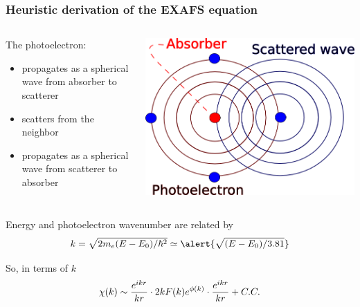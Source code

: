 \documentclass[10pt, xcolor=x11names, compress]{beamer}
\begin{document}
\begin{frame}
  \frametitle{Heuristic derivation of the EXAFS equation}
  \begin{columns}
    \begin{column}{0.5\linewidth}
      The photoelectron:
      \begin{itemize}
      \item propagates as a spherical wave from absorber to scatterer
      \item scatters from the neighbor
      \item propagates as a spherical wave from scatterer to absorber
      \end{itemize}
    \end{column}
    \begin{column}{0.5\linewidth}
      \includegraphics[width=\linewidth]{images/circles.png}
    \end{column}
  \end{columns}
  
  \bigskip

  Energy and photoelectron wavenumber are related by
  \begin{equation}
    k = \sqrt{2m_e(E-E_0)/\hbar^2} \simeq \alert{\sqrt{(E-E_0)/3.81}}\notag
  \end{equation}

  So, in terms of $k$
  \begin{equation}
    \chi(k) \sim \frac{e^{ikr}}{kr} \cdot
    2kF(k)e^{\phi(k)} \cdot
    \frac{e^{ikr}}{kr} + C.C.
    \notag
  \end{equation}
\end{frame}
\end{document}
